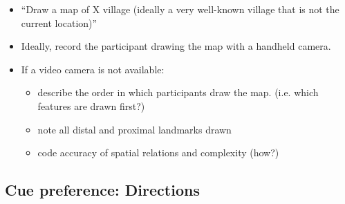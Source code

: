 \documentclass{article}
\begin{document}
\begin{itemize}

\item ``Draw a map of X village (ideally a very well-known village that is not the current location)''

\item Ideally, record the participant drawing the map with a handheld camera.

\item If a video camera is not available: 
	\begin{itemize}

	\item describe the order in which participants draw the map. (i.e. which features are drawn first?)
	
	\item note all distal and proximal landmarks drawn
	
	\item code accuracy of spatial relations and complexity (how?)	
	\end{itemize}

 
\end{itemize}


\subsection{Cue preference: Directions}
\end{document}
